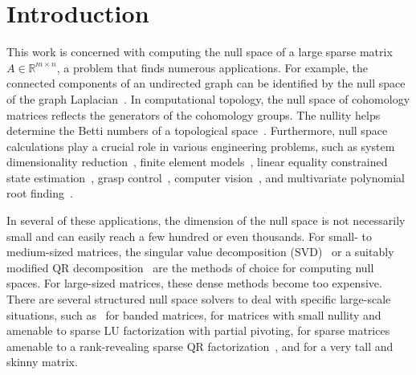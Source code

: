 \documentclass{siamart190516}
\newcommand{\R}{\mathbb{R}}
\begin{document}
\section{Introduction}
This work is concerned with computing the null space of a large sparse matrix $A\in \R^{m\times n}$, a problem
that finds numerous applications. For example, the connected components of an undirected graph can be identified by the null space of the graph Laplacian~\cite{Merris1994}. In computational topology, the null space of cohomology matrices reflects the generators of the cohomology groups. The nullity helps determine the Betti numbers of a topological space~\cite{Edelsbrunner2022}. Furthermore, null space calculations play a crucial role in various engineering problems, such as system dimensionality reduction~\cite{Ye2006}, finite element models~\cite{Shklarski2009}, linear equality constrained state estimation~\cite{Hewett2010}, grasp control~\cite{Platt2010}, computer vision~\cite{Zhang2016a}, and multivariate polynomial root finding~\cite{Batselier2014}.

In several of these applications, the dimension of the null space is not necessarily small and can easily reach a few hundred or even thousands.
For small- to medium-sized matrices, the singular value decomposition (SVD)~\cite{Golub2013} or a suitably modified QR decomposition~\cite{Foster1986} are the methods of choice for 
computing null spaces. For large-sized matrices, these dense methods become too expensive. There are several structured null space solvers to deal with specific large-scale situations, such as~\cite{Berry1985} for banded matrices, \cite{Gotsman2008} for matrices with small nullity and amenable to sparse LU factorization with partial pivoting, \cite{Foster2013} for sparse matrices amenable to a rank-revealing sparse QR factorization~\cite{Davis2011a}, and \cite{Park2023} for a very tall and skinny matrix.
\end{document}
